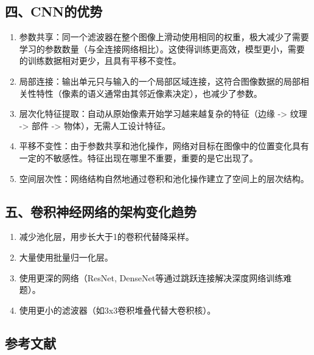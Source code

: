 \hypertarget{ux56dbcnnux7684ux4f18ux52bf}{%
\subsection{四、CNN的优势}\label{ux56dbcnnux7684ux4f18ux52bf}}

\begin{enumerate}
\def\labelenumi{\arabic{enumi}.}
\item
  参数共享：同一个滤波器在整个图像上滑动使用相同的权重，极大减少了需要学习的参数数量（与全连接网络相比）。这使得训练更高效，模型更小，需要的训练数据相对更少，且具有平移不变性。
\item
  局部连接：输出单元只与输入的一个局部区域连接，这符合图像数据的局部相关性特性（像素的语义通常由其邻近像素决定），也减少了参数。
\item
  层次化特征提取：自动从原始像素开始学习越来越复杂的特征（边缘 -\textgreater{} 纹理 -\textgreater{} 部件 -\textgreater{} 物体），无需人工设计特征。
\item
  平移不变性：由于参数共享和池化操作，网络对目标在图像中的位置变化具有一定的不敏感性。特征出现在哪里不重要，重要的是它出现了。
\item
  空间层次性：网络结构自然地通过卷积和池化操作建立了空间上的层次结构。
\end{enumerate}

\hypertarget{ux4e94ux5377ux79efux795eux7ecfux7f51ux7edcux7684ux67b6ux6784ux53d8ux5316ux8d8bux52bf}{%
\subsection{五、卷积神经网络的架构变化趋势}\label{ux4e94ux5377ux79efux795eux7ecfux7f51ux7edcux7684ux67b6ux6784ux53d8ux5316ux8d8bux52bf}}

\begin{enumerate}
\def\labelenumi{\arabic{enumi}.}
\item
  减少池化层，用步长大于1的卷积代替降采样。
\item
  大量使用批量归一化层。
\item
  使用更深的网络（ResNet, DenseNet等通过跳跃连接解决深度网络训练难题）。
\item
  使用更小的滤波器（如3x3卷积堆叠代替大卷积核）。
\end{enumerate}

\hypertarget{ux53c2ux8003ux6587ux732e-9}{%
\subsection{参考文献}\label{ux53c2ux8003ux6587ux732e-9}}

